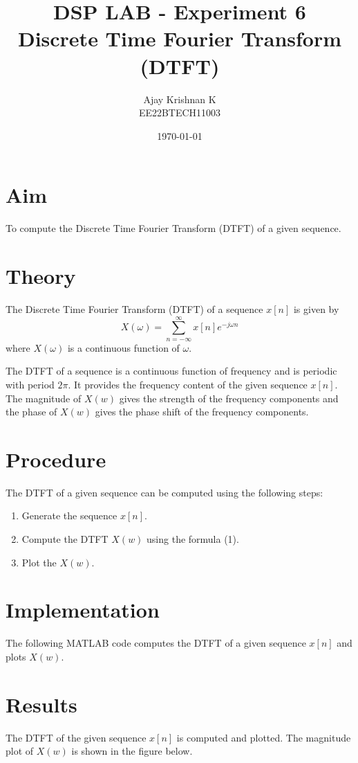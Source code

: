 \documentclass[a4paper,12pt]{article}
\title{\textbf{DSP LAB - Experiment 6} \\
        \vspace*{0.3em}
        \large{Discrete Time Fourier Transform (DTFT)} \\}
\author{Ajay Krishnan K \\  EE22BTECH11003}
\date{\today}
\begin{document}
\maketitle

\section*{Aim}
To compute the Discrete Time Fourier Transform (DTFT) of a given sequence.

\section*{Theory}
The Discrete Time Fourier Transform (DTFT) of a sequence $x[n]$ is given by
\begin{equation}
    X(\omega) = \sum_{n=-\infty}^{\infty} x[n] e^{-j\omega n}
\end{equation}
where $X(\omega)$ is a continuous function of $\omega$.

The DTFT of a sequence is a continuous function of frequency and is periodic with period $2\pi$.
It provides the frequency content of the given sequence $x[n]$. The magnitude of $X(w)$ gives the strength of the frequency components and the phase of $X(w)$ gives the phase shift of the frequency components.


\section*{Procedure}
The DTFT of a given sequence can be computed using the following steps:
\begin{enumerate}
    \item Generate the sequence $x[n]$.
    \item Compute the DTFT $X(w)$ using the formula (1).
    \item Plot the $X(w)$.
\end{enumerate}

\section*{Implementation}
The following MATLAB code computes the DTFT of a given sequence $x[n]$ and plots $X(w)$.



\section*{Results}
The DTFT of the given sequence $x[n]$ is computed and plotted. The magnitude plot of $X(w)$ is shown in the figure below.
\end{document}
